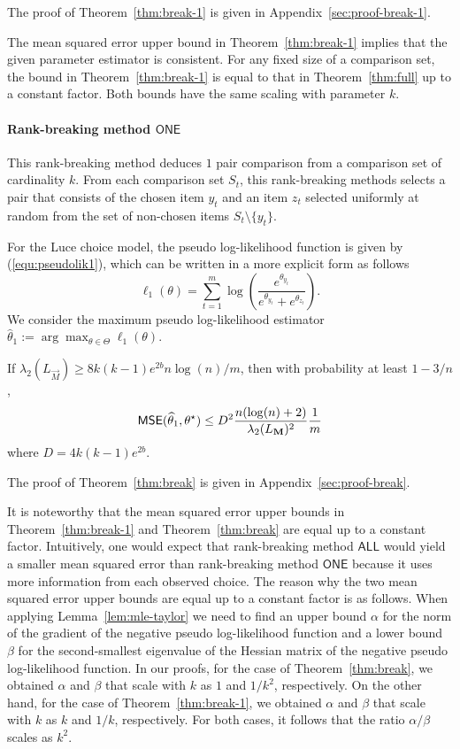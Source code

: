The proof of Theorem~\ref{thm:break-1} is given in Appendix~\ref{sec:proof-break-1}.

The mean squared error upper bound in Theorem~\ref{thm:break-1} implies that the given parameter estimator is consistent. For any fixed size of a comparison set, the bound in Theorem~\ref{thm:break-1} is equal to that in Theorem~\ref{thm:full} up to a constant factor. Both bounds have the same scaling with parameter $k$.

\label{sec:rankB}
\paragraph{Rank-breaking method $\mathsf{ONE}$} This rank-breaking method deduces $1$ pair comparison from a comparison set of cardinality $k$. From each comparison set $S_t$, this rank-breaking methods selects a pair that consists of the chosen item $y_t$ and an item $z_t$ selected uniformly at random from the set of non-chosen items $S_t\setminus \{y_t\}$. 

For the Luce choice model, the pseudo log-likelihood function is given by (\ref{equ:pseudolik1}), which can be written in a more explicit form as follows
$$
\ell_1(\theta) = \sum_{t=1}^m \log\left(\frac{e^{\theta_{y_t}}}{e^{\theta_{y_t}} + e^{\theta_{z_t}}}\right).
$$
We consider the maximum pseudo log-likelihood estimator $\widehat{\theta}_1 := \arg\max_{\theta\in \Theta} \ell_1(\theta)$.

\begin{theorem} If $\lambda_2\left(L_\vec{M} \right) \ge 8k(k-1)e^{2b}n\log (n)/m$, then with probability at least $1-3/n$,
$$
\hbox{\textup{\textsf{MSE}}}(\widehat{\theta}_1, \theta^\star) 
\le D^2\frac{n(\log(n)+2)}{\lambda_2(L_\mathbf{M})^2}\frac{1}{m}
$$
where $D = 4k(k-1) e^{2b}$.
\label{thm:break}
\end{theorem}

The proof of Theorem~\ref{thm:break} is given in Appendix~\ref{sec:proof-break}.

It is noteworthy that the mean squared error upper bounds in Theorem~\ref{thm:break-1} and Theorem~\ref{thm:break} are equal up to a constant factor. Intuitively, one would expect that rank-breaking method $\mathsf{ALL}$ would yield a smaller mean squared error than rank-breaking method $\mathsf{ONE}$ because it uses more information from each observed choice. The reason why the two mean squared error upper bounds are equal up to a constant factor is as follows. When applying Lemma~\ref{lem:mle-taylor} we need to find an upper bound $\alpha$ for the norm of the gradient of the negative pseudo log-likelihood function and a lower bound $\beta$ for the second-smallest eigenvalue of the Hessian matrix of the negative pseudo log-likelihood function. In our proofs, for the case of Theorem~\ref{thm:break}, we obtained $\alpha$ and $\beta$ that scale with $k$ as $1$ and $1/k^2$, respectively. On the other hand, for the case of Theorem~\ref{thm:break-1}, we obtained $\alpha$ and $\beta$ that scale with $k$ as $k$ and $1/k$, respectively. For both cases, it follows that the ratio $\alpha/\beta$ scales as $k^2$.


